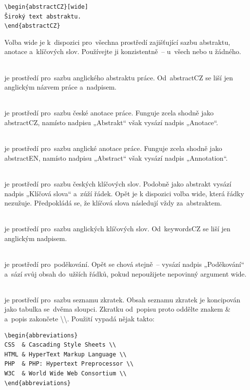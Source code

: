 \documentclass[a4paper,11pt,fonts,numbering,twoside,margins,listingsleft]{./tulpackage/tulthesis}
\newcommand{\argument}[1]{{\ttfamily\color{\tulcolor}#1}}
\newcommand{\argumentindex}[1]{\argument{#1}\index{#1}}
\newcommand{\prostredi}[1]{\argumentindex{#1}}
\newcommand{\polozka}[1]{\item[#1]\mbox{}\\}
\begin{document}
\begin{description}
    \begin{slisting}
\begin{verbatim}
\begin{abstractCZ}[wide]
Široký text abstraktu.
\end{abstractCZ}
\end{verbatim}
    \end{slisting}

    Volba \argument{wide} je k~dispozici pro~všechna prostředí zajišťující
    sazbu abstraktu, anotace a~klíčových slov. Používejte ji konzistentně~-- u~všech nebo u
    žádného.

    \polozka{\prostredi{abstractEN}} je prostředí pro~sazbu anglického abstraktu práce.
    Od~\argument{abstractCZ} se liší jen anglickým názvem práce a~nadpisem.

    \polozka{\prostredi{annotationCZ}} je prostředí pro~sazbu české anotace práce.
    Funguje zcela shodně jako \prostredi{abstractCZ}, namísto nadpisu „Abstrakt“ však vysází
    nadpis „Anotace“.

    \polozka{\prostredi{annotationEN}} je prostředí pro~sazbu anglické anotace práce.
    Funguje zcela shodně jako \prostredi{abstractEN}, namísto nadpisu „Abstract“ však vysází
    nadpis „Annotation“.

    \polozka{\prostredi{keywordsCZ}} je prostředí pro~sazbu českých klíčových slov.
    Podobně jako abstrakt vysází nadpis „Klíčová slova“ a~zúží řádek. Opět je k
    dispozici volba \argument{wide}, která řádky nezužuje. Předpokládá se, že
    klíčová slova následují vždy za~abstraktem.

    \polozka{\prostredi{keywordsEN}} je prostředí pro~sazbu anglických klíčových slov.
    Od~\argument{keywordsCZ} se liší jen anglickým nadpisem.

    \polozka{\prostredi{acknowledgement}} je prostředí pro~poděkování. Opět se chová
    stejně~-- vysází nadpis „Poděkování“ a~sází svůj obsah do~užších řádků, pokud
    nepoužijete nepovinný argument \argument{wide}.

    \polozka{\prostredi{abbreviations}} je prostředí pro~sazbu seznamu zkratek. Obsah
    seznamu zkratek je koncipován jako tabulka se~dvěma sloupci. Zkratku od~popisu
    proto oddělte znakem \argument{\&} a~popis zakončete
    \argument{\textbackslash\textbackslash}. Použití vypadá nějak takto:

\begingroup
\color{\tulcolor}
\begin{slisting}
\begin{verbatim}
\begin{abbreviations}
CSS  & Cascading Style Sheets \\
HTML & HyperText Markup Language \\
PHP  & PHP: Hypertext Preprocessor \\
W3C  & World Wide Web Consortium \\
\end{abbreviations}
\end{verbatim}
\end{slisting}
\endgroup
{}


\end{description}
\end{document}
